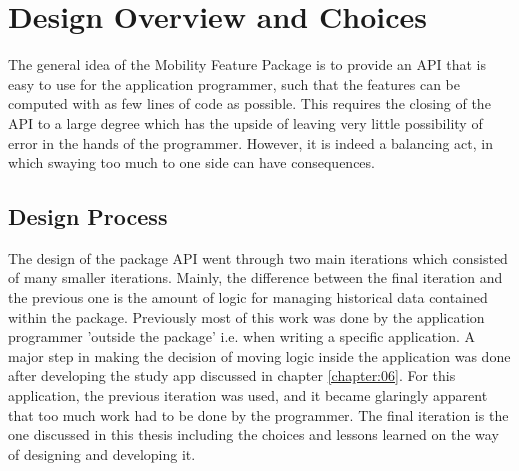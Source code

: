 \section{Design Overview and Choices}
The general idea of the Mobility Feature Package is to provide an API that is easy to use for the application programmer, such that the features can be computed with as few lines of code as possible. This requires the closing of the API to a large degree which has the upside of leaving very little possibility of error in the hands of the programmer. However, it is indeed a balancing act, in which swaying too much to one side can have consequences. 

\subsection{Design Process}
The design of the package API went through two main iterations which consisted of many smaller iterations. Mainly, the difference between the final iteration and the previous one is the amount of logic for managing historical data contained within the package. Previously most of this work was done by the application programmer 'outside the package' i.e. when writing a specific application. A major step in making the decision of moving logic inside the application was done after developing the study app discussed in chapter \ref{chapter:06}. For this application, the previous iteration was used, and it became glaringly apparent that too much work had to be done by the programmer. The final iteration is the one discussed in this thesis including the choices and lessons learned on the way of designing and developing it.

